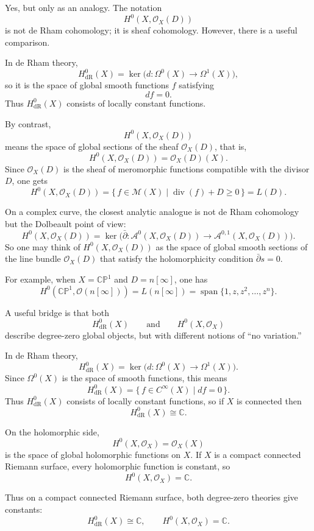 \documentclass[11pt,openany]{article}
\begin{document}
\newpage
Yes, but only as an analogy. The notation
\[
H^0(X,\mathcal O_X(D))
\]
is not de Rham cohomology; it is sheaf cohomology. However, there is a useful comparison.

In de Rham theory,
\[
H^0_{\mathrm{dR}}(X)=\ker\bigl(d:\Omega^0(X)\to \Omega^1(X)\bigr),
\]
so it is the space of global smooth functions $f$ satisfying
\[
df=0.
\]
Thus $H^0_{\mathrm{dR}}(X)$ consists of locally constant functions.

By contrast,
\[
H^0(X,\mathcal O_X(D))
\]
means the space of global sections of the sheaf $\mathcal O_X(D)$, that is,
\[
H^0(X,\mathcal O_X(D))=\mathcal O_X(D)(X).
\]
Since $\mathcal O_X(D)$ is the sheaf of meromorphic functions compatible with the divisor $D$, one gets
\[
H^0(X,\mathcal O_X(D))
=
\{\,f\in \mathcal M(X)\mid \operatorname{div}(f)+D\ge 0\,\}
=
L(D).
\]

On a complex curve, the closest analytic analogue is not de Rham cohomology but the Dolbeault point of view:
\[
H^0(X,\mathcal O_X(D))
=
\ker\bigl(\bar\partial:\mathcal A^0(X,\mathcal O_X(D))\to \mathcal A^{0,1}(X,\mathcal O_X(D))\bigr).
\]
So one may think of $H^0(X,\mathcal O_X(D))$ as the space of global smooth sections of the line bundle $\mathcal O_X(D)$ that satisfy the holomorphicity condition $\bar\partial s=0$.

For example, when $X=\mathbb{CP}^1$ and $D=n[\infty]$, one has
\[
H^0(\mathbb{CP}^1,\mathcal O(n[\infty]))
=
L(n[\infty])
=
\operatorname{span}\{1,z,z^2,\dots,z^n\}.
\]

\newpage
A useful bridge is that both
\[
H^0_{\mathrm{dR}}(X)
\qquad\text{and}\qquad
H^0(X,\mathcal O_X)
\]
describe degree-zero global objects, but with different notions of ``no variation.''

In de Rham theory,
\[
H^0_{\mathrm{dR}}(X)=\ker\bigl(d:\Omega^0(X)\to \Omega^1(X)\bigr).
\]
Since $\Omega^0(X)$ is the space of smooth functions, this means
\[
H^0_{\mathrm{dR}}(X)=\{\,f\in C^\infty(X)\mid df=0\,\}.
\]
Thus $H^0_{\mathrm{dR}}(X)$ consists of locally constant functions, so if $X$ is connected then
\[
H^0_{\mathrm{dR}}(X)\cong \mathbb C.
\]

On the holomorphic side,
\[
H^0(X,\mathcal O_X)=\mathcal O_X(X)
\]
is the space of global holomorphic functions on $X$. If $X$ is a compact connected Riemann surface, every holomorphic function is constant, so
\[
H^0(X,\mathcal O_X)=\mathbb C.
\]

Thus on a compact connected Riemann surface, both degree-zero theories give constants:
\[
H^0_{\mathrm{dR}}(X)\cong \mathbb C,
\qquad
H^0(X,\mathcal O_X)=\mathbb C.
\]
\end{document}
